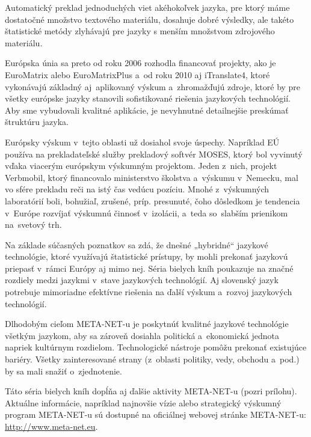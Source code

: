 \begin{multicols}{2}

Automatický preklad
jednoduchých viet akéhokoľvek jazyka, pre ktorý máme dostatočné
množstvo textového materiálu, dosahuje dobré výsledky, ale takéto
štatistické metódy zlyhávajú pre jazyky s menším množstvom zdrojového materiálu.

Európska únia sa preto od roku 2006 rozhodla financovať projekty, ako
je EuroMatrix alebo EuroMatrixPlus a~od roku 2010 aj iTranslate4, ktoré
vykonávajú základný aj~aplikovaný výskum a~zhromažďujú zdroje,
ktoré by pre všetky európske jazyky stanovili sofistikované
riešenia jazykových technológií. Aby sme vybudovali kvalitné
aplikácie, je nevyhnutné detailnejšie preskúmať štruktúru jazyka.

Európsky výskum v~tejto oblasti už dosiahol svoje úspechy.
Napríklad EÚ používa na prekladateľské služby prekladový
softvér MOSES, ktorý bol vyvinutý vďaka viacerým európskym
výskumným projektom. Jeden z~nich, projekt Verbmobil, ktorý
financovalo ministerstvo školstva a~výskumu v~Nemecku, mal vo sfére
prekladu reči na istý čas vedúcu pozíciu. Mnohé z~výskumných
laboratórií boli, bohužiaľ, zrušené, príp. presunuté, čoho
dôsledkom je tendencia v~Európe rozvíjať výskumnú činnosť
v~izolácii, a~teda so~slabším prienikom na~svetový trh.

Na základe súčasných poznatkov sa zdá, že dnešné „hybridné“ jazykové technológie, ktoré využívajú štatistické prístupy, by mohli prekonať jazykovú priepasť v~rámci Európy aj mimo nej. Séria bielych kníh poukazuje na značné rozdiely medzi jazykmi v~stave jazykových technológií. Aj slovenský jazyk potrebuje mimoriadne efektívne riešenia na ďalší výskum a~rozvoj jazykových technológií.


Dlhodobým cieľom META-NET-u je pos\-kyt\-núť kvalitné jazykové technológie všetkým jazykom, aby sa zároveň dosiahla politická a~ekonomická jednota napriek kultúrnym rozdielom. Technologické nástroje pomôžu prekonať existujúce bariéry. Všetky zainteresované strany (z~oblasti politiky, vedy, obchodu a~pod.) by sa mali snažiť o~zjednotenie.

Táto séria bielych kníh dopĺňa aj ďalšie aktivity META-NET-u (pozri prílohu). Aktuálne informácie, napríklad najnovšie vízie alebo strategický výskumný program META-NET-u sú dostupné na oficiálnej webovej stránke META-NET-u: \url{http://www.meta-net.eu}.
\end{multicols}

